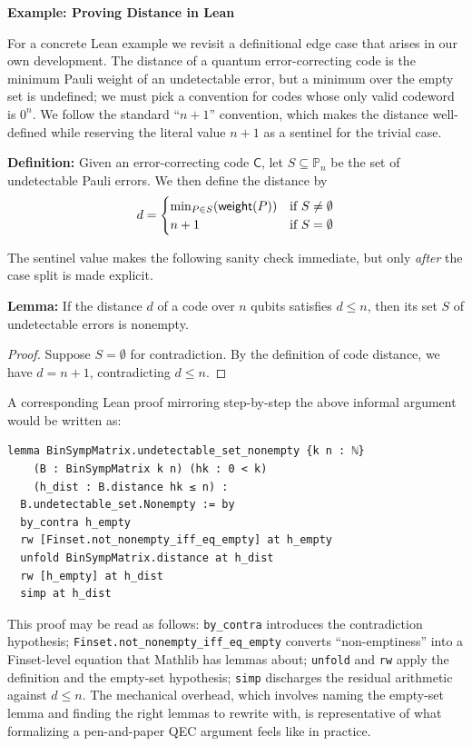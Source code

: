 \begin{mybox}{\textbf{Example: Proving Distance in Lean}}

For a concrete Lean example we revisit a definitional edge case that arises in our own
development. The distance of a quantum error-correcting code is the minimum
Pauli weight of an undetectable error, but a minimum over the empty set is
undefined; we must pick a convention for codes whose only valid codeword is
$0^n$. We follow the standard ``$n+1$'' convention, which makes the distance
well-defined while reserving the literal value $n+1$ as a sentinel for the
trivial case.

\textbf{Definition:} Given an error-correcting code $\mathsf{C}$, let $S\subseteq \mathbb{P}_n$
    be the set of undetectable Pauli errors.
    We then define the distance by
    \begin{equation}
        d = \begin{cases}
            \min_{P\in S}(\mathsf{weight}(P)) & \textnormal{if } S\ne\emptyset \\
            n+1 & \textnormal{if } S = \emptyset
        \end{cases}
    \end{equation}


The sentinel value makes the following sanity check immediate, but only
\emph{after} the case split is made explicit.

\textbf{Lemma:} If the distance $d$ of a code over $n$ qubits satisfies $d \leq n$, then its
    set $S$ of undetectable errors is nonempty.
\begin{proof}
    Suppose $S = \emptyset$ for contradiction. By the definition of code distance, we
    have $d = n+1$, contradicting $d \leq n$.
\end{proof}

A corresponding Lean proof mirroring step-by-step the above informal argument would be written as:

\begin{lstlisting}
lemma BinSympMatrix.undetectable_set_nonempty {k n : ℕ}
    (B : BinSympMatrix k n) (hk : 0 < k)
    (h_dist : B.distance hk ≤ n) :
  B.undetectable_set.Nonempty := by
  by_contra h_empty
  rw [Finset.not_nonempty_iff_eq_empty] at h_empty
  unfold BinSympMatrix.distance at h_dist
  rw [h_empty] at h_dist
  simp at h_dist
\end{lstlisting}    

This proof may be read as follows: \lstinline{by_contra} introduces the
contradiction hypothesis; \lstinline{Finset.not_nonempty_iff_eq_empty} converts
``non-emptiness'' into a Finset-level equation that Mathlib has lemmas about;
\lstinline{unfold} and \lstinline{rw} apply the definition and the empty-set
hypothesis; \lstinline{simp} discharges the residual arithmetic against $d \le
n$. The mechanical overhead, which involves naming the empty-set lemma and finding the right lemmas to rewrite with, is representative of what formalizing a pen-and-paper QEC
argument feels like in practice. 


\end{mybox}


